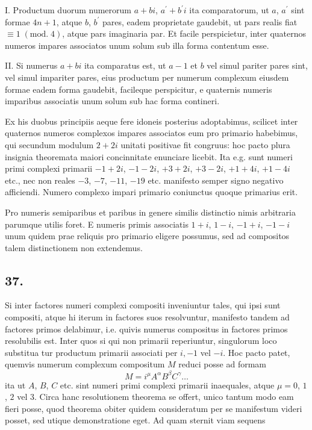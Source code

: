 \documentclass[twoside,12pt]{memoir}
\renewcommand{\pmod}[1]{\;(\textrm{mod.}\;#1)}
\begin{document}
I. Productum duorum numerorum \(a+b i\), \(a^{\prime}+b^{\prime} i\) ita comparatorum, ut \(a\), \(a^{\prime}\) sint formae \(4 n+1\), atque \(b\), \(b^{\prime}\) pares, eadem proprietate gaudebit, ut pars realis fiat \(\equiv 1\pmod{4}\), atque pars imaginaria par. Et facile perspicietur, inter quaternos numeros impares associatos unum solum sub illa forma contentum esse.
 
II. Si numerus \(a+b i\) ita comparatus est, ut \(a-1\) et \(b\) vel simul pariter pares sint, vel simul impariter pares, eius productum per numerum complexum eiusdem formae eadem forma gaudebit, facileque perspicitur, e quaternis numeris imparibus associatis unum solum sub hac forma contineri.

Ex his duobus principiis aeque fere idoneis posterius adoptabimus, scilicet inter quaternos numeros complexos impares associatos eum pro primario habebimus, qui secundum modulum \(2+2 i\) unitati positivae fit congruus: hoc pacto plura insignia theoremata maiori concinnitate enunciare licebit. Ita e.g. sunt numeri primi complexi primarii \(-1+2 i\), \(-1-2 i\), \(+3+2 i\), \(+3-2 i\), \(+1+4 i\), \(+1-4 i\) etc., nec non reales \(-3\), \(-7\), \(-11\), \(-19\) etc. manifesto semper signo negativo afficiendi. Numero complexo impari primario coniunctus quoque primarius erit.
 
Pro numeris semiparibus et paribus in genere similis distinctio nimis arbitraria parumque utilis foret. E numeris primis associatis \(1+i\), \(1-i\), \(-1+i\), \(-1-i\) unum quidem prae reliquis pro primario eligere possumus, sed ad compositos talem distinctionem non extendemus.

\subsection*{37.}
 
Si inter factores numeri complexi compositi inveniuntur tales, qui ipsi sunt compositi, atque hi iterum in factores suos resolvuntur, manifesto tandem ad factores primos delabimur, i.e. quivis numerus compositus in factores primos resolubilis est. Inter quos si qui non primarii reperiuntur, singulorum loco substitua\pagebreak%
tur productum primarii associati per \(i,-1\) vel \(-i\). Hoc pacto patet, quemvis numerum complexum compositum \(M\) reduci posse ad formam
\[M=i^{\mu} A^{\alpha} B^{\beta} C^{\gamma} \ldots\]
ita ut \(A\), \(B\), \(C\) etc. sint numeri primi complexi primarii inaequales, atque \(\mu=0\), \(1\), \(2\) vel \(3\). Circa hanc resolutionem theorema se offert, unico tantum modo eam fieri posse, quod theorema obiter quidem consideratum per se manifestum videri posset, sed utique demonstratione eget. Ad quam sternit viam sequens
\end{document}
